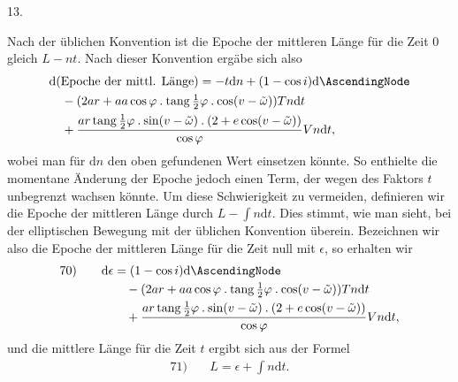 \par{}\bigskip
{}
\begin{center}13.\end{center}
\noindent\hspace*{\parindent}Nach der üblichen Konvention ist die Epoche der mittleren Länge für die Zeit \(0\) gleich \(L-nt\). Nach dieser Konvention ergäbe sich also
\[
\begin{aligned}
&\mathrm{d}(\text{Epoche der mittl. Länge})=-t\mathrm{d}n+(1-\cos i)\mathrm{d}\AscendingNode\\
&\quad-(2ar+aa\cos\varphi\mathbin{.}\operatorname{tang}\tfrac12\varphi\mathbin{.}\cos(v-\tilde\omega))Tn\mathrm{d}t\\
&\quad+\dfrac{ar\operatorname{tang}\tfrac12\varphi\mathbin{.}\sin(v-\tilde\omega)\mathbin{.}(2+e\cos(v-\tilde\omega))}{\cos\varphi}Vn\mathrm{d}t,
\end{aligned}
\]
wobei man für\raisebox{-.45ex}{-} \(\mathrm{d}n\) den oben gefundenen Wert einsetzen könnte. So enthielte die momentane Änderung der Epoche jedoch einen Term, der wegen des Faktors \(t\) unbegrenzt wachsen könnte. Um diese Schwierigkeit zu vermeiden, definieren wir die Epoche der mittleren Länge durch \(L-\int n\mathrm{d}t\). Dies stimmt, wie man sieht, bei der elliptischen Bewegung mit der üblichen Konvention überein. Bezeichnen wir also die Epoche der mittleren Länge für die Zeit null mit \(\epsilon\), so erhalten wir
\[
\begin{array}{rl}
70)\quad&\begin{aligned}[t]\mathrm{d}\epsilon&=(1-\cos i)\mathrm{d}\AscendingNode\\
&\quad-(2ar+aa\cos\varphi\mathbin{.}\operatorname{tang}\tfrac12\varphi\mathbin{.}\cos(v-\tilde\omega))Tn\mathrm{d}t\\
&\quad+\dfrac{ar\operatorname{tang}\tfrac12\varphi\mathbin{.}\sin(v-\tilde\omega)\mathbin{.}(2+e\cos(v-\tilde\omega))}{\cos\varphi}Vn\mathrm{d}t,\end{aligned}
\end{array}
\]
und die mittlere Länge für die Zeit \(t\) ergibt sich aus der Formel
\[
\begin{array}{rl}
71)\quad&L=\epsilon+\int n\mathrm{d}t.
\end{array}
\]
